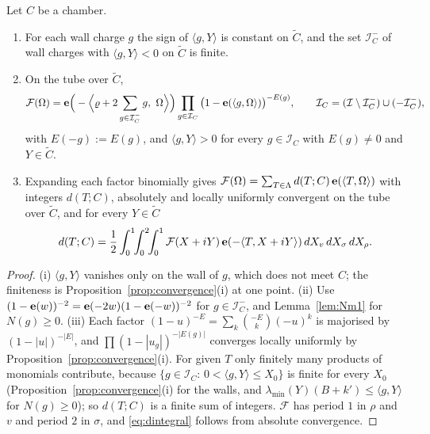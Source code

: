 \begin{lemma}\label{lem:chamberexp}
Let $C$ be a chamber.
\begin{enumerate}
\item[(i)] For each wall charge $g$ the sign of $\langle g,Y\rangle$ is constant on $\tilde C$, and the set $\mathcal I^-_C$ of wall charges with $\langle g,Y\rangle<0$ on $\tilde C$ is finite.
\item[(ii)] On the tube over $\tilde C$,
\[
\mathcal F(\Omega)=\e\Big(-\Big\langle\varrho+2\sum_{g\in\mathcal I^-_C}g,\ \Omega\Big\rangle\Big)\prod_{g\in\mathcal I_C}\big(1-\e(\langle g,\Omega\rangle)\big)^{-E(g)},\qquad \mathcal I_C=(\mathcal I\setminus\mathcal I^-_C)\cup(-\mathcal I^-_C),
\]
with $E(-g):=E(g)$, and $\langle g,Y\rangle>0$ for every $g\in\mathcal I_C$ with $E(g)\ne0$ and $Y\in\tilde C$.
\item[(iii)] Expanding each factor binomially gives $\mathcal F(\Omega)=\sum_{T\in\Lambda}d(T;C)\,\mathbf e(\langle T,\Omega\rangle)$ with integers $d(T;C)$, absolutely and locally uniformly convergent on the tube over $\tilde C$, and for every $Y\in\tilde C$
\begin{equation}\label{eq:dintegral}
d(T;C)=\frac12\int_0^1\!\!\int_0^2\!\!\int_0^1\mathcal F(X+iY)\,\mathbf e(-\langle T,X+iY\rangle)\,dX_v\,dX_\sigma\,dX_\rho .
\end{equation}
\end{enumerate}
\end{lemma}

\begin{proof}
(i) $\langle g,Y\rangle$ vanishes only on the wall of $g$, which does not meet $C$; the finiteness is Proposition~\ref{prop:convergence}(i) at one point. (ii) Use $(1-\mathbf e(w))^{-2}=\mathbf e(-2w)(1-\mathbf e(-w))^{-2}$ for $g\in\mathcal I^-_C$, and Lemma~\ref{lem:Nm1} for $N(g)\ge0$. (iii) Each factor $(1-u)^{-E}=\sum_k\binom{-E}{k}(-u)^k$ is majorised by $(1-|u|)^{-|E|}$, and $\prod(1-|u_g|)^{-|E(g)|}$ converges locally uniformly by Proposition~\ref{prop:convergence}(i). For given $T$ only finitely many products of monomials contribute, because $\{g\in\mathcal I_C:\,0<\langle g,Y\rangle\le X_0\}$ is finite for every $X_0$ (Proposition~\ref{prop:convergence}(i) for the walls, and $\lambda_{\min}(Y)(B+k')\le\langle g,Y\rangle$ for $N(g)\ge0$); so $d(T;C)$ is a finite sum of integers. $\mathcal F$ has period $1$ in $\rho$ and $v$ and period $2$ in $\sigma$, and \eqref{eq:dintegral} follows from absolute convergence.
\end{proof}

